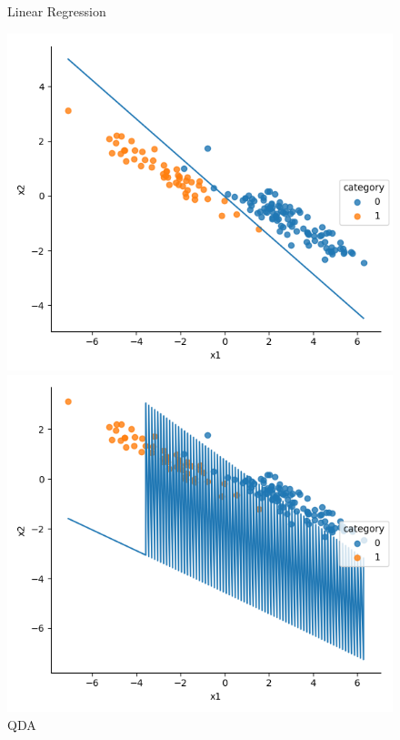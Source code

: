 \documentclass[a4paper]{article}
\begin{document}
\begin{figure}[h]
\begin{minipage}{0,45\textwidth}
\end{minipage}
\begin{minipage}{0,45\textwidth}
\caption{Linear Regression}
\includegraphics[scale=.4]{a_lr.png}
\end{minipage}
\begin{minipage}{0,45\textwidth}
\caption{QDA}
\includegraphics[scale=.4]{a_qda.png}
\end{minipage}
\end{figure}
\end{document}
